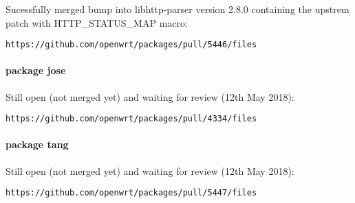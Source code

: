 Sucessfully merged bump into libhttp-parser version 2.8.0 containing the upstrem patch with HTTP\_STATUS\_MAP macro:
\begin{lstlisting}[columns=fixed,basicstyle=\ttfamily\footnotesize,tabsize=4,backgroundcolor=\color{yellow!10}]
https://github.com/openwrt/packages/pull/5446/files
\end{lstlisting}


\paragraph{package jose}

Still open (not merged yet) and waiting for review (12th May 2018):
\begin{lstlisting}[columns=fixed,basicstyle=\ttfamily\footnotesize,tabsize=4,backgroundcolor=\color{yellow!10}]
https://github.com/openwrt/packages/pull/4334/files
\end{lstlisting}


\paragraph{package tang}
Still open (not merged yet) and waiting for review (12th May 2018):
\begin{lstlisting}[columns=fixed,basicstyle=\ttfamily\footnotesize,tabsize=4,backgroundcolor=\color{yellow!10}]
https://github.com/openwrt/packages/pull/5447/files
\end{lstlisting}
